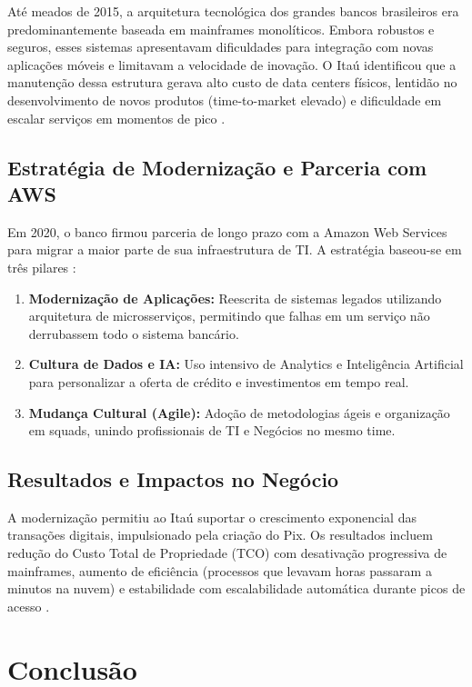 \documentclass[12pt,a4paper,oneside]{article}
\begin{document}
Até meados de 2015, a arquitetura tecnológica dos grandes bancos brasileiros era predominantemente baseada em mainframes monolíticos. Embora robustos e seguros, esses sistemas apresentavam dificuldades para integração com novas aplicações móveis e limitavam a velocidade de inovação. O Itaú identificou que a manutenção dessa estrutura gerava alto custo de data centers físicos, lentidão no desenvolvimento de novos produtos (time-to-market elevado) e dificuldade em escalar serviços em momentos de pico \cite{itauchold2025}.

\subsection{Estratégia de Modernização e Parceria com AWS}

Em 2020, o banco firmou parceria de longo prazo com a Amazon Web Services para migrar a maior parte de sua infraestrutura de TI. A estratégia baseou-se em três pilares \cite{itauchold2020}:

\begin{enumerate}
  \item \textbf{Modernização de Aplicações:} Reescrita de sistemas legados utilizando arquitetura de microsserviços, permitindo que falhas em um serviço não derrubassem todo o sistema bancário.
  \item \textbf{Cultura de Dados e IA:} Uso intensivo de Analytics e Inteligência Artificial para personalizar a oferta de crédito e investimentos em tempo real.
  \item \textbf{Mudança Cultural (Agile):} Adoção de metodologias ágeis e organização em squads, unindo profissionais de TI e Negócios no mesmo time.
\end{enumerate}

\subsection{Resultados e Impactos no Negócio}

A modernização permitiu ao Itaú suportar o crescimento exponencial das transações digitais, impulsionado pela criação do Pix. Os resultados incluem redução do Custo Total de Propriedade (TCO) com desativação progressiva de mainframes, aumento de eficiência (processos que levavam horas passaram a minutos na nuvem) e estabilidade com escalabilidade automática durante picos de acesso \cite{itauchold2023}.

\section{Conclusão}
\end{document}
